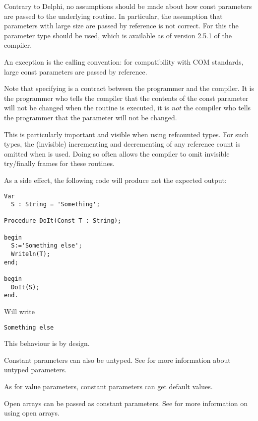\begin{remark}
Contrary to Delphi, no assumptions should be made about how const parameters
are passed to the underlying routine. In particular, the assumption that
parameters with large size are passed by reference is not correct. For this
the  parameter type should be used, which is available as of
version 2.5.1 of the compiler.

An exception is the  calling convention: for compatibility with
COM standards, large const parameters are passed by reference.
\end{remark}

\begin{remark}
Note that specifying  is a contract between the programmer and the
compiler. It is the programmer who tells the compiler that the contents of
the const parameter will not be changed when the routine is executed, it is 
{\em not} the compiler who tells the programmer that the parameter will not be 
changed. 

This is particularly important and visible when using refcounted types. 
For such types, the (invisible) incrementing and decrementing of any reference 
count is omitted when  is used. Doing so often allows the compiler 
to omit invisible try/finally frames for these routines.

As a side effect, the following code will produce not the expected output:
\begin{verbatim}
Var
  S : String = 'Something';

Procedure DoIt(Const T : String);

begin
  S:='Something else';
  Writeln(T);
end;

begin
  DoIt(S);
end.
\end{verbatim}
Will write 
\begin{verbatim}
Something else
\end{verbatim}
This behaviour is by design.
\end{remark}

Constant parameters can also be untyped. See  for more
information about untyped parameters.

As for value parameters, constant parameters can get default values.

Open arrays can be passed as constant parameters. See  for
more information on using open arrays.

